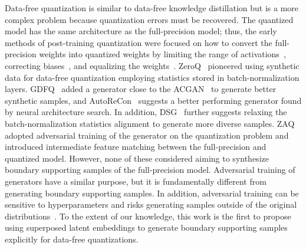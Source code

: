 \documentclass{article}
\newcommand{\rev}[1]{{\color{olivegreen}#1}}
\renewcommand{\rev}[1]{#1}
\begin{document}
Data-free quantization is similar to data-free knowledge distillation but is a more complex problem because quantization errors must be recovered.
The quantized model has the same architecture as the full-precision model; thus, the early methods of post-training quantization were focused on how to convert the full-precision weights into quantized weights by limiting the range of activations~\cite{aciq, outlier}, correcting biases~\cite{aciq, dfq}, and equalizing the weights~\cite{dfq, outlier}.
ZeroQ~\cite{zeroq} pioneered using synthetic data for data-free quantization employing statistics stored in batch-normalization layers.
GDFQ~\cite{gdfq} added a generator close to the ACGAN~\cite{acgan} to generate better synthetic samples, 
\rev{and AutoReCon~\cite{autorecon} suggests a better performing generator found by neural architecture search.
In addition, DSG~\cite{zhang2021diversifying} further suggests relaxing the batch-normalization statistics alignment to generate more diverse samples.}
ZAQ~\cite{zaq} adopted adversarial training of the generator on the quantization problem and introduced intermediate feature matching between the full-precision and quantized model.
However, none of these considered aiming to synthesize boundary supporting samples of the full-precision model. 
Adversarial training of generators have a similar purpose, but it is fundamentally different from generating boundary supporting samples. 
In addition, adversarial training can be sensitive to hyperparameters and risks generating samples outside of the original distributions~\cite{outofmanifold}.
To the extent of our knowledge, this work is the first to propose using superposed latent embeddings to generate boundary supporting samples explicitly for data-free quantizations.
\end{document}
